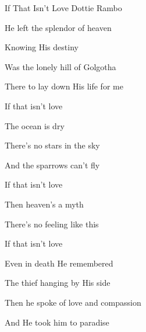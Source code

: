\documentclass[12pt]{book}
\newcommand{\WBColBrk}{%
  \ifWordBk%
  \newpage%
\fi}
\begin{document}
\WBColBrk

\begin{song}{If That Isn't Love}{}
  {}
  {Dottie Rambo}
  {}
  {}

  \begin{SBVerse}
    He left the splendor of heaven

    Knowing His destiny

    Was the lonely hill of Golgotha

    There to lay down His life for me
  \end{SBVerse}

  \begin{SBOpGroup}
    If that isn't love

    The ocean is dry

    There's no stars in the sky

    And the sparrows can't fly

    If that isn't love

    Then heaven's a myth

    There's no feeling like this

    If that isn't love
  \end{SBOpGroup}

  \begin{SBVerse}
    Even in death He remembered

    The thief hanging by His side

    Then he spoke of love and compassion

    And He took him to paradise
  \end{SBVerse}
\end{song}
\end{document}
